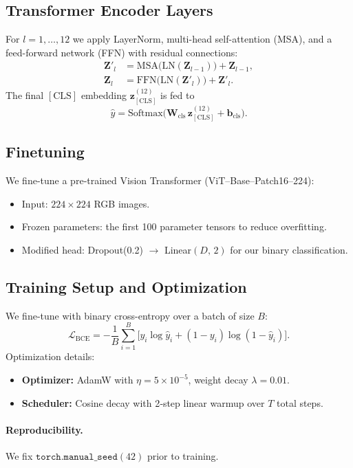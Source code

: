 \subsection{Transformer Encoder Layers}
For \(l=1,\dots,12\) we apply LayerNorm, multi-head self-attention (MSA), and a feed-forward network (FFN) with residual connections:
\[
  \begin{aligned}
    \mathbf{Z}'_{l} &= \mathrm{MSA}\bigl(\mathrm{LN}(\mathbf{Z}_{l-1})\bigr) + \mathbf{Z}_{l-1},\\
    \mathbf{Z}_{l}  &= \mathrm{FFN}\bigl(\mathrm{LN}(\mathbf{Z}'_{l})\bigr)  + \mathbf{Z}'_{l}.
  \end{aligned}
\]
The final \(\mathrm{[CLS]}\) embedding \(\mathbf{z}_{\mathrm{[CLS]}}^{(12)}\) is fed to
\[
  \hat{y}
  = \mathrm{Softmax}\!\bigl(\mathbf{W}_{\mathrm{cls}}\,\mathbf{z}_{\mathrm{[CLS]}}^{(12)} + \mathbf{b}_{\mathrm{cls}}\bigr).
\]

\subsection{Finetuning}
We fine-tune a pre‐trained Vision Transformer (ViT–Base–Patch16–224):
\begin{itemize}
  \item Input: $224\times224$ RGB images.
  \item Frozen parameters: the first 100 parameter tensors to reduce overfitting.
  \item Modified head: Dropout(0.2) \(\to\) Linear$(D,\,2)$ for our binary classification.
\end{itemize}

\subsection{Training Setup and Optimization}
We fine-tune with binary cross-entropy over a batch of size \(B\):
\[
  \mathcal{L}_{\mathrm{BCE}}
  = -\frac{1}{B}\sum_{i=1}^B
    \bigl[y_i\log\hat{y}_i + (1 - y_i)\log(1 - \hat{y}_i)\bigr].
\]
Optimization details:
\begin{itemize}
  \item \textbf{Optimizer:} AdamW with \(\eta=5\times10^{-5}\), weight decay \(\lambda=0.01\).  
  \item \textbf{Scheduler:} Cosine decay with 2‐step linear warmup over \(T\) total steps.  
\end{itemize}

\paragraph{Reproducibility.} We fix \(\texttt{torch.manual\_seed}(42)\) prior to training.

